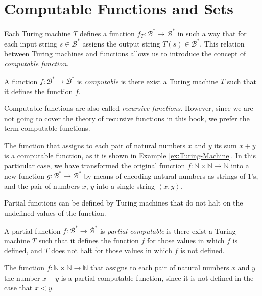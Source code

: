 %
%

\section{Computable Functions and Sets}
\label{sec:computable_functions}

Each Turing machine $T$ defines a function $f_T:\mathcal{B}^{\ast}\rightarrow\mathcal{B}^{\ast}$ in such a way that for each input string $s\in\mathcal{B}^{\ast}$ assigns the output string $T(s)\in\mathcal{B}^{\ast}$. This relation between Turing machines and functions allows us to introduce the concept of \emph{computable function}. 

\begin{definition}
\label{def:computable-function}
A function $f:\mathcal{B}^{\ast}\rightarrow\mathcal{B}^{\ast}$ is \emph{computable} is there exist a Turing machine $T$ such that it defines the function $f$.
\end{definition}

Computable functions are also called \emph{recursive functions}. However, since we are not going to cover the theory of recursive functions in this book, we prefer the term computable functions.

\begin{example}
The function that assigns to each pair of natural numbers $x$ and $y$ its sum $x + y$ is a computable function, as it is shown in Example \ref{ex:Turing-Machine}. In this particular case, we have transformed the original function $f: \mathbb{N} \times \mathbb{N} \rightarrow \mathbb{N}$ into a new function $g:\mathcal{B}^{\ast}\rightarrow\mathcal{B}^{\ast}$ by means of encoding natural numbers as strings of 1's, and the pair of numbers $x$, $y$ into a single string $\left\langle x, y \right\rangle$.
\end{example}

Partial functions can be defined by Turing machines that do not halt on the undefined values of the function.

\begin{definition}
A partial function $f:\mathcal{B}^{\ast}\rightarrow\mathcal{B}^{\ast}$ is \emph{partial computable} is there exist a Turing machine $T$ such that it defines the function $f$ for those values in which $f$ is defined, and $T$ does not halt for those values in which $f$ is not defined.
\end{definition}

\begin{example}
The function $f: \mathbb{N} \times \mathbb{N} \rightarrow \mathbb{N}$ that assigns to each pair of natural numbers $x$ and $y$ the number $x - y$ is a partial computable function, since it is not defined in the case that $x < y$.
\end{example}


